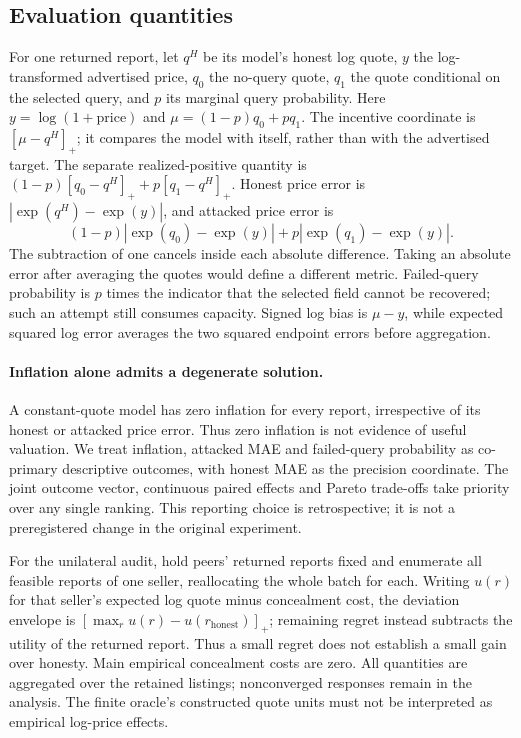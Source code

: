 \documentclass[11pt]{article}
\begin{document}
\subsection{Evaluation quantities}
For one returned report, let $q^H$ be its model's honest log quote, $y$ the
log-transformed advertised price, $q_0$ the no-query quote, $q_1$ the quote
conditional on the selected query, and $p$ its marginal query probability.
Here $y=\log(1+\mathrm{price})$ and $\mu=(1-p)q_0+pq_1$.
The incentive coordinate is $[\mu-q^H]_+$; it compares the model with
itself, rather than with the advertised target. The separate realized-positive
quantity is $(1-p)[q_0-q^H]_++p[q_1-q^H]_+$.
Honest price error is $|\exp(q^H)-\exp(y)|$, and attacked price error is
\[
 (1-p)|\exp(q_0)-\exp(y)|+p|\exp(q_1)-\exp(y)|.
\]
The subtraction of one cancels inside each absolute difference. Taking an
absolute error after averaging the quotes would define a different metric.
Failed-query probability is $p$ times the indicator that the selected field
cannot be recovered; such an attempt still consumes capacity. Signed log bias
is $\mu-y$, while expected squared log error averages the two squared endpoint
errors before aggregation.

\paragraph{Inflation alone admits a degenerate solution.}
A constant-quote model has zero inflation for every report, irrespective of
its honest or attacked price error. Thus zero inflation is not evidence of
useful valuation. We treat inflation, attacked MAE and failed-query probability
as co-primary descriptive outcomes, with honest MAE as the precision coordinate.
The joint outcome vector, continuous paired effects and Pareto trade-offs take
priority over any single ranking. This reporting choice is retrospective;
it is not a preregistered change in the original experiment.

For the unilateral audit, hold peers' returned reports fixed and enumerate
all feasible reports of one seller, reallocating the whole batch for each.
Writing $u(r)$ for that seller's expected log quote minus concealment cost,
the deviation envelope is $[\max_r u(r)-u(r_{\mathrm{honest}})]_+$; remaining
regret instead subtracts the utility of the returned report. Thus a small
regret does not establish a small gain over honesty. Main empirical concealment
costs are zero. All quantities are aggregated over the retained listings;
nonconverged responses remain in the analysis. The finite oracle's constructed
quote units must not be interpreted as empirical log-price effects.
\end{document}
